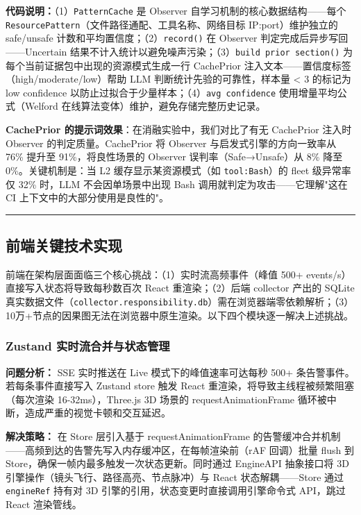 \documentclass[a4paper]{ctexart}
\makeatletter
\renewcommand{\_}{%
  \ifmmode
    \nfss@text{\textunderscore}%
  \else
    \textunderscore\discretionary{}{}{}%
  \fi}
\makeatother
\begin{document}
\textbf{代码说明：}（1）\texttt{PatternCache} 是 Observer 自学习机制的核心数据结构——每个 \texttt{ResourcePattern}（文件路径通配、工具名称、网络目标 IP:port）维护独立的 safe/unsafe 计数和平均置信度；（2）\texttt{record()} 在 Observer 判定完成后异步写回——Uncertain 结果不计入统计以避免噪声污染；（3）\texttt{build\_prior\_section()} 为每个当前证据包中出现的资源模式生成一行 CachePrior 注入文本——置信度标签（high/moderate/low）帮助 LLM 判断统计先验的可靠性，样本量 < 3 的标记为 low confidence 以防止过拟合于少量样本；（4）\texttt{avg\_confidence} 使用增量平均公式（Welford 在线算法变体）维护，避免存储完整历史记录。


\textbf{CachePrior 的提示词效果}：在消融实验中，我们对比了有无 CachePrior 注入时 Observer 的判定质量。CachePrior 将 Observer 与启发式引擎的方向一致率从 76\% 提升至 91\%，将良性场景的 Observer 误判率（Safe→Unsafe）从 8\% 降至 0\%。关键机制是：当 L2 缓存显示某资源模式（如 \texttt{tool:Bash}）的 fleet 级异常率仅 32\% 时，LLM 不会因单场景中出现 Bash 调用就判定为攻击——它理解"这在 CI 上下文中的大部分使用是良性的"。


\bigskip
\hrule
\bigskip

\subsection{前端关键技术实现}

前端在架构层面面临三个核心挑战：（1）实时流高频事件（峰值 500+ events/s）直接写入状态将导致每秒数百次 React 重渲染；（2）后端 collector 产出的 SQLite 真实数据文件（\texttt{collector.responsibility.db}）需在浏览器端零依赖解析；（3）10万+节点的因果图无法在浏览器中原生渲染。以下四个模块逐一解决上述挑战。

\subsubsection{Zustand 实时流合并与状态管理}

\textbf{问题分析：} SSE 实时推送在 Live 模式下的峰值速率可达每秒 500+ 条告警事件。若每条事件直接写入 Zustand store 触发 React 重渲染，将导致主线程被频繁阻塞（每次渲染 16-32ms），Three.js 3D 场景的 requestAnimationFrame 循环被中断，造成严重的视觉卡顿和交互延迟。

\textbf{解决策略：} 在 Store 层引入基于 requestAnimationFrame 的告警缓冲合并机制——高频到达的告警先写入内存缓冲区，在每帧渲染前（rAF 回调）批量 flush 到 Store，确保一帧内最多触发一次状态更新。同时通过 EngineAPI 抽象接口将 3D 引擎操作（镜头飞行、路径高亮、节点脉冲）与 React 状态解耦——Store 通过 \texttt{engineRef} 持有对 3D 引擎的引用，状态变更时直接调用引擎命令式 API，跳过 React 渲染管线。
\end{document}
